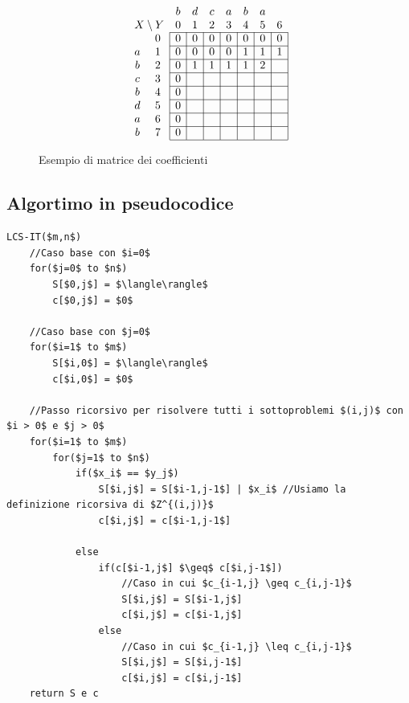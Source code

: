 \begin{figure}[h]
    \[
\begin{array}{cc|c|c|c|c|c|c|c|}
\multicolumn{2}{c}{} & \multicolumn{1}{c}{b} & \multicolumn{1}{c}{d} & \multicolumn{1}{c}{c} & \multicolumn{1}{c}{a} & \multicolumn{1}{c}{b} & \multicolumn{1}{c}{a} \\
\multicolumn{2}{c}{X \setminus Y} & \multicolumn{1}{c}{0} & \multicolumn{1}{c}{1} & \multicolumn{1}{c}{2} & \multicolumn{1}{c}{3} & \multicolumn{1}{c}{4} & \multicolumn{1}{c}{5} & \multicolumn{1}{c}{6} \\
\cline{3-9}
  & 0 & 0 & 0 & 0 & 0 & 0 & 0 & 0 \\
\cline{3-9}
a & 1 & 0 & 0 & 0 & 0 & 1 & 1 & 1 \\
\cline{3-9}
b & 2 & 0 & 1 & 1 & 1 & 1 & 2 & \\
\cline{3-9}
c & 3 & 0 & & & & & & \\
\cline{3-9}
b & 4 & 0 & & & & & & \\
\cline{3-9}
d & 5 & 0 & & & & & & \\
\cline{3-9}
a & 6 & 0 & & & & & & \\
\cline{3-9}
b & 7 & 0 & & & & & & \\
\cline{3-9}
\end{array}
\]

\caption{Esempio di matrice dei coefficienti}
\end{figure}

\newpage
\subsection{Algortimo in pseudocodice}
\begin{lstlisting}[mathescape=true]
LCS-IT($m,n$)
    //Caso base con $i=0$
    for($j=0$ to $n$)
        S[$0,j$] = $\langle\rangle$
        c[$0,j$] = $0$

    //Caso base con $j=0$
    for($i=1$ to $m$)
        S[$i,0$] = $\langle\rangle$
        c[$i,0$] = $0$

    //Passo ricorsivo per risolvere tutti i sottoproblemi $(i,j)$ con $i > 0$ e $j > 0$
    for($i=1$ to $m$)
        for($j=1$ to $n$)
            if($x_i$ == $y_j$)
                S[$i,j$] = S[$i-1,j-1$] | $x_i$ //Usiamo la definizione ricorsiva di $Z^{(i,j)}$
                c[$i,j$] = c[$i-1,j-1$]

            else
                if(c[$i-1,j$] $\geq$ c[$i,j-1$])
                    //Caso in cui $c_{i-1,j} \geq c_{i,j-1}$
                    S[$i,j$] = S[$i-1,j$] 
                    c[$i,j$] = c[$i-1,j$]
                else
                    //Caso in cui $c_{i-1,j} \leq c_{i,j-1}$
                    S[$i,j$] = S[$i,j-1$]
                    c[$i,j$] = c[$i,j-1$]
    return S e c



        
\end{lstlisting}

